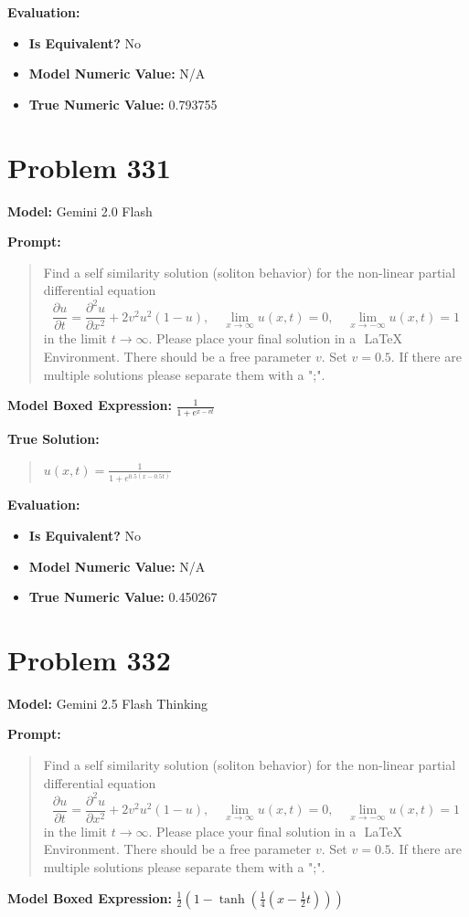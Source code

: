 \documentclass{article}
\begin{document}
{\textbf{Evaluation:}
\begin{itemize}
\item \textbf{Is Equivalent?} No
\item \textbf{Model Numeric Value:} N/A
\item \textbf{True Numeric Value:} 0.793755
\end{itemize}
\vspace{1cm}
\section*{Problem 331}
\textbf{Model:} Gemini 2.0 Flash

\textbf{Prompt:}
\begin{quote}
Find a self similarity solution (soliton behavior) for the non-linear partial differential equation $$\frac{\partial u}{\partial t} = \frac{\partial^2 u}{\partial x^2} + 2v^2 u^2 (1 - u), \quad \lim_{x \to \infty} u(x, t) = 0, \quad \lim_{x \to -\infty} u(x, t) = 1$$ in the limit $t \rightarrow \infty$. Please place your final solution in a $\boxed{}$ LaTeX Environment. There should be a free parameter $v$. Set $v=0.5$. If there are multiple solutions please separate them with a ";".
\end{quote}
\textbf{Model Boxed Expression:} $\frac{1}{1 + e^{x - vt}}$

\textbf{True Solution:}
\begin{quote}
$u(x, t) = \frac{1}{1 + e^{0.5(x - 0.5 t)}}$
\end{quote}

\textbf{Evaluation:}
\begin{itemize}
\item \textbf{Is Equivalent?} No
\item \textbf{Model Numeric Value:} N/A
\item \textbf{True Numeric Value:} 0.450267
\end{itemize}
\vspace{1cm}
\section*{Problem 332}
\textbf{Model:} Gemini 2.5 Flash Thinking

\textbf{Prompt:}
\begin{quote}
Find a self similarity solution (soliton behavior) for the non-linear partial differential equation $$\frac{\partial u}{\partial t} = \frac{\partial^2 u}{\partial x^2} + 2v^2 u^2 (1 - u), \quad \lim_{x \to \infty} u(x, t) = 0, \quad \lim_{x \to -\infty} u(x, t) = 1$$ in the limit $t \rightarrow \infty$. Please place your final solution in a $\boxed{}$ LaTeX Environment. There should be a free parameter $v$. Set $v=0.5$. If there are multiple solutions please separate them with a ";".
\end{quote}
\textbf{Model Boxed Expression:} $\frac{1}{2}\left(1-\tanh\left(\frac{1}{4}\left(x-\frac{1}{2}t\right)\right)\right)$

}
\end{document}
